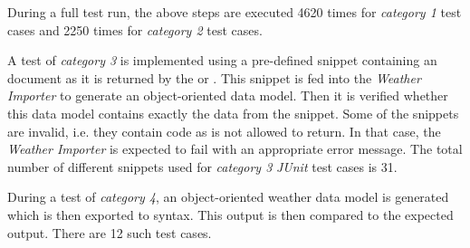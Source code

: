 During a full test run, the above steps are executed \num{4620} times for \emph{category 1} test cases and \num{2250} times for \emph{category 2} test cases.

A test of \emph{category 3} is implemented using a pre-defined snippet containing an  document as it is returned by the  or \yrno. This snippet is fed into the \emph{Weather Importer} to generate an object-oriented data model. Then it is verified whether this data model contains exactly the data from the snippet. Some of the snippets are invalid, i.e. they contain  code as \yrno is not allowed to return. %
In that case, the \emph{Weather Importer} is expected to fail with an appropriate error message. The total number of different snippets used for \emph{category 3} \emph{JUnit} test cases is \num{31}.

During a test of \emph{category 4}, an object-oriented weather data model is generated which is then exported to  syntax. This output is then compared to the expected output. There are \num{12} such test cases.
